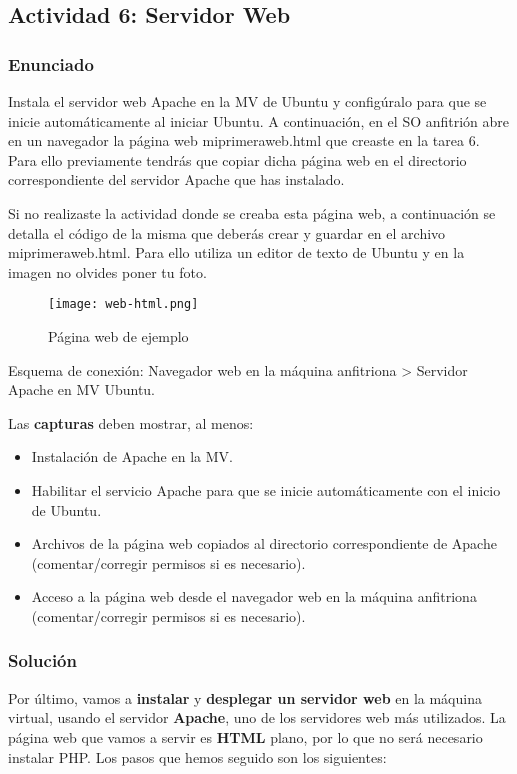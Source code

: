 \subsection{Actividad 6: Servidor Web}

\subsubsection{Enunciado}
Instala el servidor web Apache en la MV de Ubuntu y configúralo para que se inicie automáticamente al iniciar Ubuntu. A continuación, en el SO anfitrión abre en un navegador la página web miprimeraweb.html que creaste en la tarea 6. Para ello previamente tendrás que copiar dicha página web en el directorio correspondiente del servidor Apache que has instalado.

Si no realizaste la actividad donde se creaba esta página web, a continuación se detalla el código de la misma que deberás crear y guardar en el archivo miprimeraweb.html. Para ello utiliza un editor de texto de Ubuntu y en la imagen no olvides poner tu foto.

\begin{figure}[H]
    \centering
    \texttt{[image: web-html.png]}
    \caption{Página web de ejemplo}
\end{figure}

Esquema de conexión: Navegador web en la máquina anfitriona > Servidor Apache en MV Ubuntu.

Las \textbf{capturas} deben mostrar, al menos:

\begin{itemize}
    \item Instalación de Apache en la MV.
    \item Habilitar el servicio Apache para que se inicie automáticamente con el inicio de Ubuntu.
    \item Archivos de la página web copiados al directorio correspondiente de Apache (comentar/corregir permisos si es necesario).
    \item Acceso a la página web desde el navegador web en la máquina anfitriona (comentar/corregir permisos si es necesario).
\end{itemize}

\subsubsection{Solución}
Por último, vamos a \textbf{instalar} y \textbf{desplegar un servidor web} en la máquina virtual, usando el servidor \textbf{Apache}, uno de los servidores web más utilizados. La página web que vamos a servir es \textbf{HTML} plano, por lo que no será necesario instalar PHP. Los pasos que hemos seguido son los siguientes:

